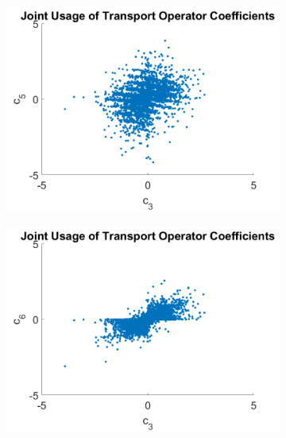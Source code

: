 \documentclass[letterpaper]{article} %
\begin{document}
\begin{figure}[ht]
\centering
\begin{subfigure}[b]{0.45\columnwidth}
  \centering
	{\includegraphics[width=0.95\columnwidth]{jointCoeff_c3_c5.png}}
  \caption{}
	\label{subfig:jointCoeff35}
\end{subfigure}
\begin{subfigure}[b]{0.45\columnwidth}
  \centering
	{\includegraphics[width=0.95\columnwidth]{jointCoeff_c3_c6.png}}
  \caption{}
	\label{subfig:jointCoeff36}
\end{subfigure}
\begin{subfigure}[b]{0.45\columnwidth}
  \centering

\end{subfigure}
\end{figure}
\end{document}

